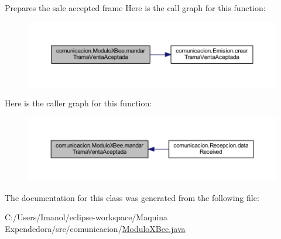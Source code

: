 Prepares the sale accepted frame Here is the call graph for this function\+:
\nopagebreak
\begin{figure}[H]
\begin{center}
\leavevmode
\includegraphics[width=350pt]{classcomunicacion_1_1_modulo_x_bee_a71bbc67392676c9e0bd57813a87d06c0_cgraph}
\end{center}
\end{figure}
Here is the caller graph for this function\+:
\nopagebreak
\begin{figure}[H]
\begin{center}
\leavevmode
\includegraphics[width=350pt]{classcomunicacion_1_1_modulo_x_bee_a71bbc67392676c9e0bd57813a87d06c0_icgraph}
\end{center}
\end{figure}


The documentation for this class was generated from the following file\+:\begin{DoxyCompactItemize}
\item 
C\+:/\+Users/\+Imanol/eclipse-\/workspace/\+Maquina Expendedora/src/comunicacion/\mbox{\hyperlink{_modulo_x_bee_8java}{Modulo\+X\+Bee.\+java}}\end{DoxyCompactItemize}

